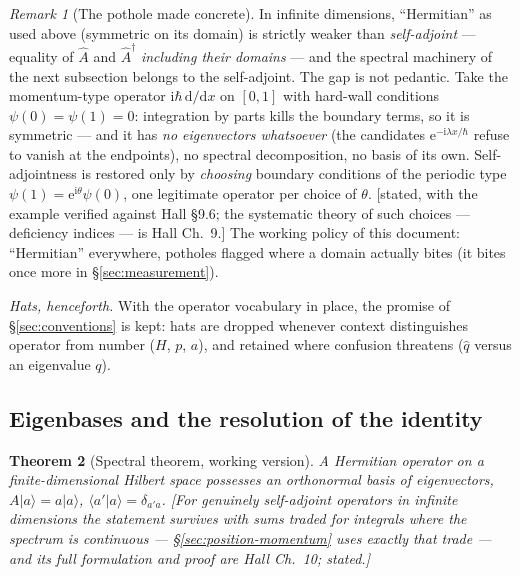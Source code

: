 \documentclass[11pt]{article}
\theoremstyle{plain}
\newtheorem{theorem}{Theorem}[section]
\theoremstyle{definition}
\theoremstyle{remark}
\newtheorem{remark}[theorem]{Remark}
\newcommand{\dd}{\mathrm{d}}
\newcommand{\ee}{\mathrm{e}}
\newcommand{\ii}{\mathrm{i}}
\newcommand{\op}[1]{\hat{#1}}
\newcommand{\ket}[1]{\lvert #1 \rangle}
\newcommand{\braket}[2]{\langle #1 | #2 \rangle}
\begin{document}
\begin{remark}[The pothole made concrete]
\label{rem:self-adjoint-pothole}
In infinite dimensions, ``Hermitian'' as used above (symmetric on
its domain) is strictly weaker than \emph{self-adjoint} --- equality
of $\op A$ and $\op A^\dagger$ \emph{including their domains} ---
and the spectral machinery of the next subsection belongs to the
self-adjoint. The gap is not pedantic. Take the momentum-type
operator $\ii\hbar\,\dd/\dd x$ on $[0,1]$ with hard-wall conditions
$\psi(0) = \psi(1) = 0$: integration by parts kills the boundary
terms, so it is symmetric --- and it has \emph{no eigenvectors
whatsoever} (the candidates $\ee^{-\ii\lambda x/\hbar}$ refuse to
vanish at the endpoints), no spectral decomposition, no basis of its
own. Self-adjointness is restored only by \emph{choosing} boundary
conditions of the periodic type $\psi(1) = \ee^{\ii\theta}\psi(0)$,
one legitimate operator per choice of $\theta$. [stated, with the
example verified against Hall \S9.6; the systematic theory of such
choices --- deficiency indices --- is Hall Ch.\ 9.] The working
policy of this document: ``Hermitian'' everywhere, potholes flagged
where a domain actually bites (it bites once more in
\S\ref{sec:measurement}).
\end{remark}

\noindent
\emph{Hats, henceforth.} With the operator vocabulary in place, the
promise of \S\ref{sec:conventions} is kept: hats are dropped
whenever context distinguishes operator from number ($H$, $p$, $a$),
and retained where confusion threatens ($\op q$ versus an eigenvalue
$q$).

\subsection{Eigenbases and the resolution of the identity}
\label{sec:adapted-coordinates}

\begin{theorem}[Spectral theorem, working version]
\label{thm:spectral}
A Hermitian operator on a finite-dimensional Hilbert space possesses
an orthonormal basis of eigenvectors,
$A\ket a = a\ket a$, $\braket{a'\!}a = \delta_{a'a}$. [For genuinely
self-adjoint operators in infinite dimensions the statement survives
with sums traded for integrals where the spectrum is continuous ---
\S\ref{sec:position-momentum} uses exactly that trade --- and its
full formulation and proof are Hall Ch.\ 10; stated.]
\end{theorem}
\end{document}

